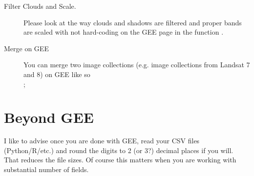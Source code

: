 \begin{description}
\item [Filter Clouds and Scale.]
Please look at the way clouds and shadows are
filtered and proper bands are scaled with not hard-coding
on the GEE page\cite{MaskCloudShadowScaleprepSrL8}
in the function .

\item [Merge on GEE] You can merge
two image collections (e.g. image collections from Landsat 7 and 8)
on GEE like so \\
;

\end{description}

\section{Beyond GEE}
I like to advise once you are done with GEE,
read your CSV files (Python/R/etc.) and round the 
digits to 2 (or 3?) decimal places
if you will. That reduces the file sizes.
Of course this matters when you are working
with substantial number of fields.

